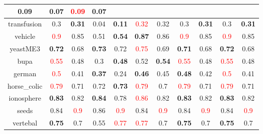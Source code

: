 \documentclass{article}%
\begin{document}
\begin{tabular}{c|cccccccccc}
{0.09
}&0.07&\textcolor{red}{ 
0.09
}&0.07\\%
\hline%
transfusion&0.3&\textbf{0.31}&0.04&\textbf{0.11}&\textcolor{red}{ 
0.32
}&0.32&0.3&\textbf{0.31}&0.3&\textbf{0.31}\\%
\hline%
vehicle&\textcolor{red}{ 
0.9
}&0.85&0.51&\textbf{0.54}&\textbf{0.87}&0.86&\textcolor{red}{ 
0.9
}&0.85&\textcolor{red}{ 
0.9
}&0.85\\%
\hline%
yeastME3&\textbf{0.72}&0.68&\textbf{0.73}&0.72&\textcolor{red}{ 
0.75
}&0.69&\textbf{0.71}&0.68&\textbf{0.72}&0.68\\%
\hline%
bupa&\textcolor{red}{ 
0.55
}&0.48&0.3&\textbf{0.48}&0.52&\textbf{0.54}&\textcolor{red}{ 
0.55
}&0.48&\textcolor{red}{ 
0.55
}&0.48\\%
\hline%
german&\textcolor{red}{ 
0.5
}&0.41&\textbf{0.37}&0.24&\textbf{0.46}&0.45&\textbf{0.48}&0.42&\textcolor{red}{ 
0.5
}&0.41\\%
\hline%
horse\_colic&\textcolor{red}{ 
0.79
}&0.71&0.72&\textbf{0.73}&\textcolor{red}{ 
0.79
}&0.7&\textcolor{red}{ 
0.79
}&0.71&\textcolor{red}{ 
0.79
}&0.71\\%
\hline%
ionosphere&\textbf{0.83}&0.82&\textbf{0.84}&0.78&\textcolor{red}{ 
0.86
}&0.82&\textbf{0.83}&0.82&\textbf{0.83}&0.82\\%
\hline%
seeds&0.84&\textcolor{red}{ 
0.9
}&0.86&\textcolor{red}{ 
0.9
}&0.84&\textcolor{red}{ 
0.9
}&0.84&\textcolor{red}{ 
0.9
}&0.84&\textcolor{red}{ 
0.9
}\\%
\hline%
vertebal&\textbf{0.75}&0.7&0.55&\textcolor{red}{ 
0.77
}&\textcolor{red}{ 
0.77
}&0.7&\textbf{0.75}&0.7&\textbf{0.75}&0.7\\%
\hline%
\end{tabular}

%
\end{document}
